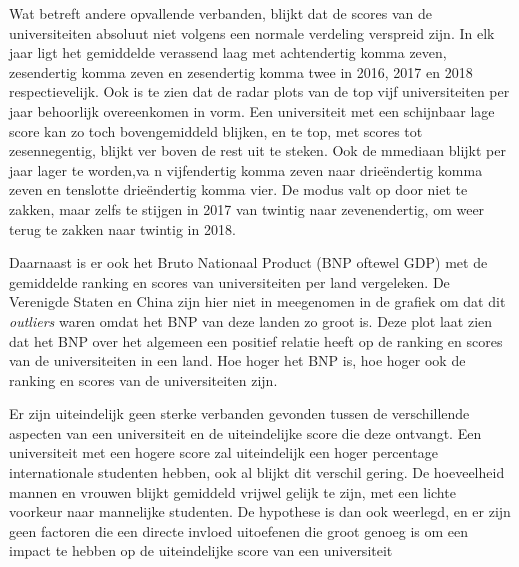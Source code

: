 \documentclass{uva-inf-article}
\begin{document}
Wat betreft andere opvallende verbanden, blijkt dat de scores van de universiteiten absoluut niet volgens een normale verdeling verspreid zijn. In elk jaar ligt het gemiddelde verassend laag met achtendertig komma zeven, zesendertig komma zeven en zesendertig komma twee in 2016, 2017 en 2018 respectievelijk. Ook is te zien dat de radar plots van de top vijf universiteiten per jaar behoorlijk overeenkomen in vorm. Een universiteit met een schijnbaar lage score kan zo toch bovengemiddeld blijken, en te top, met scores tot zesennegentig, blijkt ver boven de rest uit te steken. Ook de mmediaan blijkt per jaar lager te worden,va n vijfendertig komma zeven naar drieëndertig komma zeven en tenslotte drieëndertig komma vier. De modus valt op door niet te zakken, maar zelfs te stijgen in 2017 van twintig naar zevenendertig, om weer terug te zakken naar twintig in 2018.  

Daarnaast is er ook het Bruto Nationaal Product (BNP oftewel GDP) met de gemiddelde ranking en scores van universiteiten per land vergeleken. De Verenigde Staten en China zijn hier niet in meegenomen in de grafiek om dat dit \textit{outliers} waren omdat het BNP van deze landen zo groot is. Deze plot laat zien dat het BNP over het algemeen een positief relatie heeft op de ranking en scores van de universiteiten in een land. Hoe hoger het BNP is, hoe hoger ook de ranking en scores van de universiteiten zijn.

Er zijn uiteindelijk geen sterke verbanden gevonden tussen de verschillende aspecten van een universiteit en de uiteindelijke score die deze ontvangt. Een universiteit met een hogere score zal uiteindelijk een hoger percentage internationale studenten hebben, ook al blijkt dit verschil gering. De hoeveelheid mannen en vrouwen blijkt gemiddeld vrijwel gelijk te zijn, met een lichte voorkeur naar mannelijke studenten. 
De hypothese is dan ook weerlegd, en er zijn geen factoren die een directe invloed uitoefenen die groot genoeg is om een impact te hebben op de uiteindelijke score van een universiteit


\newpage

\end{document}
